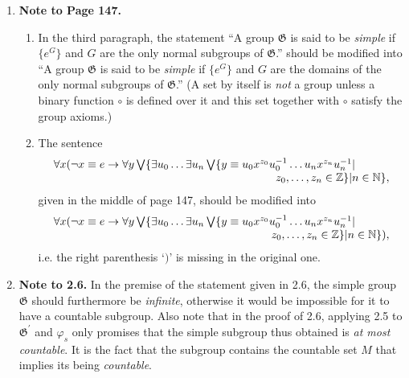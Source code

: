 \begin{enumerate}[1.]
%
\item \textbf{Note to Page 147.}
\begin{enumerate}[(1)]
\item In the third paragraph, the statement ``A group $\mathfrak{G}$ is said to be \emph{simple} if $\{ e^G \}$ and $G$ are the only normal subgroups of $\mathfrak{G}$.'' should be modified into ``A group $\mathfrak{G}$ is said to be \emph{simple} if $\{ e^G \}$ and $G$ are the domains of the only normal subgroups of $\mathfrak{G}$.'' (A set by itself is \emph{not} a group unless a binary function $\circ$ is defined over it and this set together with $\circ$ satisfy the group axioms.)
\item The sentence
\[
\begin{array}{r}
\forall x (\neg x \equiv e \rightarrow \forall y \bigvee \{ \exists u_0 \ldots \exists u_n \bigvee \{ y \equiv u_0 x^{z_0} u_0^{-1} \ldots u_n x^{z_n} u_n^{-1} | \phantom{n \in \mathbb{N} \} } \cr
z_0, \ldots, z_n \in \mathbb{Z} \} | n \in \mathbb{N} \},
\end{array}
\]
given in the middle of page 147, should be modified into
\[
\begin{array}{r}
\forall x (\neg x \equiv e \rightarrow \forall y \bigvee \{ \exists u_0 \ldots \exists u_n \bigvee \{ y \equiv u_0 x^{z_0} u_0^{-1} \ldots u_n x^{z_n} u_n^{-1} | \phantom{n \in \mathbb{N} \} } \cr
z_0, \ldots, z_n \in \mathbb{Z} \} | n \in \mathbb{N} \} ),
\end{array}
\]
i.e. the right parenthesis `$)$' is missing in the original one.
\end{enumerate}
%
\item \textbf{Note to 2.6.} In the premise of the statement given in 2.6, the simple group $\mathfrak{G}$ should furthermore be \emph{infinite}, otherwise it would be impossible for it to have a countable subgroup. Also note that in the proof of 2.6, applying 2.5 to $\mathfrak{G}^\prime$ and $\varphi_s$ only promises that the simple subgroup thus obtained is \emph{at most countable}. It is the fact that the subgroup contains the countable set $M$ that implies its being \emph{countable}.
%

\end{enumerate}

